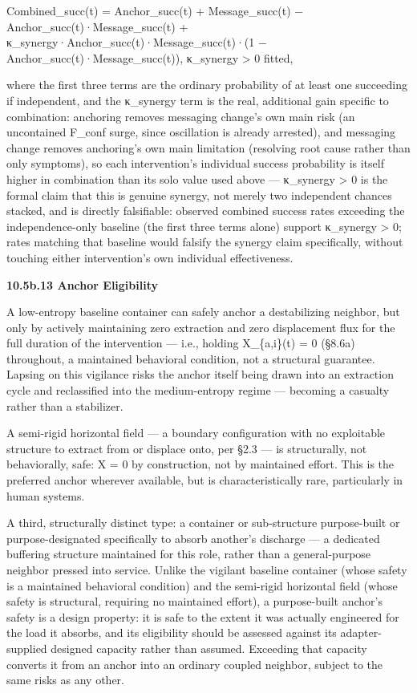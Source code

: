 \documentclass[
]{article}
\begin{document}
Combined\_succ(t) = Anchor\_succ(t) + Message\_succ(t) −
Anchor\_succ(t)·Message\_succ(t) +
κ\_synergy·Anchor\_succ(t)·Message\_succ(t)·(1 −
Anchor\_succ(t)·Message\_succ(t)), κ\_synergy \textgreater{} 0 fitted,

where the first three terms are the ordinary probability of at least one
succeeding if independent, and the κ\_synergy term is the real,
additional gain specific to combination: anchoring removes messaging
change's own main risk (an uncontained F\_conf surge, since oscillation
is already arrested), and messaging change removes anchoring's own main
limitation (resolving root cause rather than only symptoms), so each
intervention's individual success probability is itself higher in
combination than its solo value used above --- κ\_synergy \textgreater{}
0 is the formal claim that this is genuine synergy, not merely two
independent chances stacked, and is directly falsifiable: observed
combined success rates exceeding the independence-only baseline (the
first three terms alone) support κ\_synergy \textgreater{} 0; rates
matching that baseline would falsify the synergy claim specifically,
without touching either intervention's own individual effectiveness.

\textbf{10.5b.13 Anchor Eligibility}

A low-entropy baseline container can safely anchor a destabilizing
neighbor, but only by actively maintaining zero extraction and zero
displacement flux for the full duration of the intervention --- i.e.,
holding X\_\{a,i\}(t) = 0 (§8.6a) throughout, a maintained behavioral
condition, not a structural guarantee. Lapsing on this vigilance risks
the anchor itself being drawn into an extraction cycle and reclassified
into the medium-entropy regime --- becoming a casualty rather than a
stabilizer.

A semi-rigid horizontal field --- a boundary configuration with no
exploitable structure to extract from or displace onto, per §2.3 --- is
structurally, not behaviorally, safe: X = 0 by construction, not by
maintained effort. This is the preferred anchor wherever available, but
is characteristically rare, particularly in human systems.

A third, structurally distinct type: a container or sub-structure
purpose-built or purpose-designated specifically to absorb another's
discharge --- a dedicated buffering structure maintained for this role,
rather than a general-purpose neighbor pressed into service. Unlike the
vigilant baseline container (whose safety is a maintained behavioral
condition) and the semi-rigid horizontal field (whose safety is
structural, requiring no maintained effort), a purpose-built anchor's
safety is a design property: it is safe to the extent it was actually
engineered for the load it absorbs, and its eligibility should be
assessed against its adapter-supplied designed capacity rather than
assumed. Exceeding that capacity converts it from an anchor into an
ordinary coupled neighbor, subject to the same risks as any other.
\end{document}

